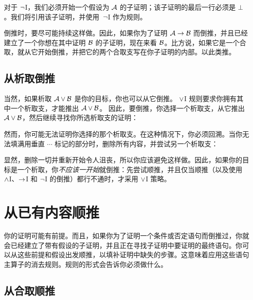 对于 $\neg$I，我们必须开始一个假设为 $\mathcal{A}$ 的子证明；该子证明的最后一行必须是 $\bot$。我们将引用该子证明，并使用~$\neg$I 作为规则。

倒推时，要尽可能持续这样做。因此，如果你为了证明 $\mathcal{A} \rightarrow \mathcal{B}$ 而倒推，并且已经建立了一个你想在其中证明 $\mathcal{B}$ 的子证明，现在来看 $\mathcal{B}$。比方说，如果它是一个合取，就从它开始倒推，并把它的两个合取支写在你子证明的内部。以此类推。

\subsection*{从析取倒推}

当然，如果析取 $\mathcal{A} \vee \mathcal{B}$ 是你的目标，你也可以从它倒推。
$\vee$I 规则要求你拥有其中一个析取支，才能推出 $\mathcal{A} \vee \mathcal{B}$。
因此，要倒推，你选择一个析取支，从它推出 $\mathcal{A} \vee \mathcal{B}$，然后继续寻找你所选析取支的证明：


\begin{fitchproof}
	\ellipsesline
\end{fitchproof}


然而，你可能无法证明你选择的那个析取支。在这种情况下，你必须回溯。当你无法填满用垂直 $\cdots$ 标记的部分时，删除所有内容，并尝试另一个析取支：


\begin{fitchproof}
	\ellipsesline
\end{fitchproof}


显然，删除一切并重新开始令人沮丧，所以你应该避免这样做。因此，如果你的目标是一个析取，你\emph{不应该一开始}就倒推：先尝试顺推，并且仅当顺推（以及使用 $\wedge$I、$\rightarrow$I 和 $\neg$I 的倒推）都行不通时，才采用 $\vee$I 策略。

\section{从已有内容顺推}

你的证明可能有前提。而且，如果你为了证明一个条件或否定语句而倒推过，你就会已经建立了带有假设的子证明，并且正在寻找子证明中要证明的最终语句。你可以从这些前提和假设出发顺推，以填补证明中缺失的步骤。这意味着应用这些语句主算子的消去规则。规则的形式会告诉你必须做什么。

\subsection*{从合取顺推}

